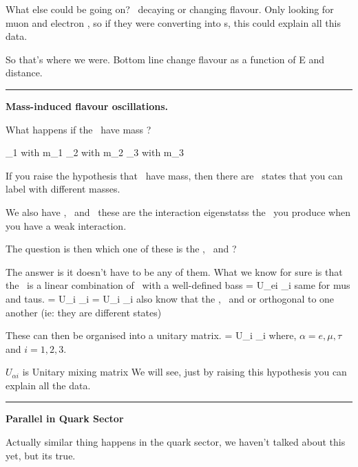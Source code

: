 {What else could be going on?
\nus\ decaying or changing flavour.
Only looking for muon and electron \nus, so if they were converting into \nutau s, this could explain all this data.




So that's where we were. 
Bottom line \nus change flavour as a function of E and distance. 

\noindent\rule{\textwidth}{1pt}

\textbf{Mass-induced flavour oscillations.}

What happens if the \nus\ have mass ?

\be
\nu_1 \textrm{ with } m_1
\ee
\be
\nu_2 \textrm{ with } m_2
\ee
\be
\nu_3 \textrm{ with } m_3
\ee

If you raise the hypothesis that \nus\ have mass, then there are \nus\ states that you can label with different masses.

We also have \nue, \numu\ and \nutau\ these are the interaction eigenstatss the \nus\ you produce when you have a weak interaction. 

The question is then which one of these is the \nue, \numu\ and \nutau ?

The answer is it doesn't have to be any of them.
What we know for sure is that the \nue\ is a linear combination of \nus\ with a well-defined bass
\be
\nue = U_{ei} \nu_i
\ee
same for mus and taus. 
\be
\numu = U_{\mu i} \nu_i
\ee
\be
\nutau = U_{\tau i} \nu_i
\ee
also know that the \nue, \numu\ and \nutau or orthogonal to one another (ie: they are different states) 

These can then be organised into a unitary matrix. 
\be
\nualpha = U_{\alpha i} \nu_i
\ee
where, $\alpha = e, \mu, \tau$ and $i = 1,2,3$.

$U_{\alpha i}$ is Unitary mixing matrix
We will see, just by raising this hypothesis you can explain all the data.

\noindent\rule{\textwidth}{1pt}
\textbf{Parallel in Quark Sector}

Actually similar thing happens in the quark sector, we haven't talked about this yet, but its true.

}
